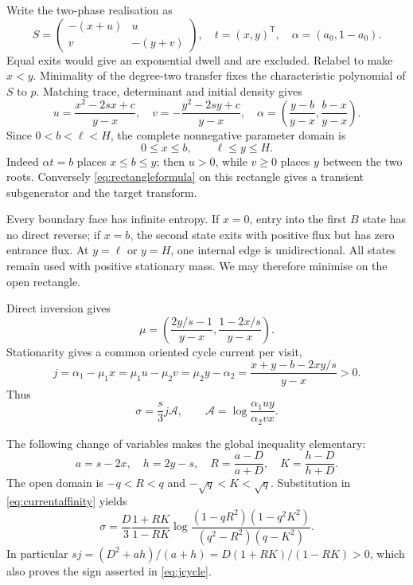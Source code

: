 \documentclass[11pt,a4paper]{article}
\theoremstyle{remark}\newtheorem{remark}[theorem]{Remark}
\begin{document}
Write the two-phase realisation as
\begin{equation}
 S=\begin{pmatrix}-(x+u)&u\\v&-(y+v)\end{pmatrix},\quad
 t=(x,y)^{\mathsf T},\quad \alpha=(a_0,1-a_0).
\end{equation}
Equal exits would give an exponential dwell and are excluded. Relabel to make
$x<y$. Minimality of the degree-two transfer fixes the characteristic
polynomial of $S$ to $p$. Matching trace, determinant and initial density gives
\begin{equation}\label{eq:rectangleformula}
 u=\frac{x^2-2sx+c}{y-x},\quad
 v=-\frac{y^2-2sy+c}{y-x},\quad
 \alpha=\left(\frac{y-b}{y-x},\frac{b-x}{y-x}\right).
\end{equation}
Since $0<b<\ell<H$, the complete nonnegative parameter domain is
\begin{equation}\label{eq:rectangle}
 0\leq x\leq b,\qquad \ell\leq y\leq H.
\end{equation}
Indeed $\alpha t=b$ places $x\leq b\leq y$; then $u>0$, while $v\geq0$
places $y$ between the two roots. Conversely \eqref{eq:rectangleformula}
on this rectangle gives a transient subgenerator and the target transform.

Every boundary face has infinite entropy. If $x=0$, entry into the first
$B$ state has no direct reverse; if $x=b$, the second state exits with
positive flux but has zero entrance flux. At $y=\ell$ or $y=H$, one internal
edge is unidirectional. All states remain used with positive stationary mass.
We may therefore minimise on the open rectangle.

Direct inversion gives
\begin{equation}\label{eq:twomu}
 \mu=\left(\frac{2y/s-1}{y-x},\frac{1-2x/s}{y-x}\right).
\end{equation}
Stationarity gives a common oriented cycle current per visit,
\begin{equation}\label{eq:jcycle}
 j=\alpha_1-\mu_1x
  =\mu_1u-\mu_2v=\mu_2y-\alpha_2
  =\frac{x+y-b-2xy/s}{y-x}>0.
\end{equation}
Thus
\begin{equation}\label{eq:currentaffinity}
 \sigma=\frac{s}{3}j\mathcal A,\qquad
 \mathcal A=\log\frac{\alpha_1uy}{\alpha_2vx}.
\end{equation}

The following change of variables makes the global inequality elementary:
\begin{equation}\label{eq:coordinates}
 a=s-2x,\quad h=2y-s,\quad
 R=\frac{a-D}{a+D},\quad K=\frac{h-D}{h+D}.
\end{equation}
The open domain is $-q<R<q$ and $-\sqrt q<K<\sqrt q$. Substitution in
\eqref{eq:currentaffinity} yields
\begin{equation}\label{eq:mastertwo}
 \sigma=\frac D3\frac{1+RK}{1-RK}
 \log\frac{(1-qR^2)(1-q^2K^2)}{(q^2-R^2)(q-K^2)}.
\end{equation}
In particular $sj=(D^2+ah)/(a+h)=D(1+RK)/(1-RK)>0$,
which also proves the sign asserted in \eqref{eq:jcycle}.
\end{document}
